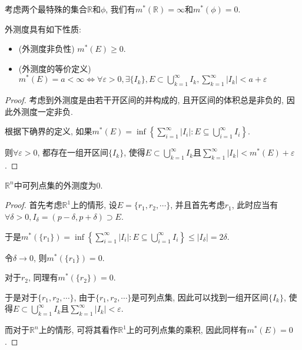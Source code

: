 \documentclass[theorem=false,mathfont=none,openany,sub3section]{easybook}
\begin{document}
\begin{example}
  考虑两个最特殊的集合$\mathbb{R}$和$\phi$, 我们有$m^{*}(\mathbb{R})=\infty$和$m^{*}(\phi)=0$.\par
\end{example}

\begin{proposition}
  外测度具有如下性质:\par
  \begin{itemize}
    \item (外测度非负性) $m^{*}(E)\geqslant 0$.
    \item (外测度的等价定义) $m^{*}(E)=a<\infty \Leftrightarrow \forall \varepsilon >0, \exists \{I_k\}, E\subset \bigcup_{k=1}^{\infty}I_k, \sum_{k=1}^{\infty}|I_k|<a+\varepsilon$
  \end{itemize}
\end{proposition}

\begin{proof}
  考虑到外测度是由若干开区间的并构成的, 且开区间的体积总是非负的, 因此外测度一定非负.\par
  根据下确界的定义, 如果$m^{*}(E)=\inf\left\{\sum_{i=1}^{\infty}|I_i|: E\subseteq \bigcup_{i=1}^{\infty}I_i\right\}$.\par
  则$\forall \varepsilon >0$, 都存在一组开区间$\{I_k\}$, 使得$E\subset \bigcup_{k=1}^{\infty}I_k$且$\sum_{k=1}^{\infty}|I_k|<m^{*}(E)+\varepsilon$.\par
\end{proof}

\begin{corollary}
  $\mathbb{R}^n$中可列点集的外测度为0.\par
\end{corollary}

\begin{proof}
  首先考虑$\mathbb{R}^1$上的情形, 设$E=\{r_1,r_2,\cdots\}$, 并且首先考虑$r_1$, 此时应当有$\forall \delta >0, I_{\delta} = (p-\delta,p+\delta)\supset E$.\par
  于是$m^{*}(\{r_1\})=\inf\left\{\sum_{i=1}^{\infty}|I_i|: E\subseteq \bigcup_{i=1}^{\infty}I_i\right\}\leqslant |I_{\delta}|=2\delta.$\par
  令$\delta \to 0$, 则$m^{*}(\{r_1\})=0$.\par
  对于$r_2$, 同理有$m^{*}(\{r_2\})=0$.\par
  于是对于$\{r_1,r_2,\cdots\}$, 由于$\{r_1,r_2,\cdots\}$是可列点集, 因此可以找到一组开区间$\{I_k\}$, 使得$E\subset \bigcup_{k=1}^{\infty}I_k$且$\sum_{k=1}^{\infty}|I_k|<\varepsilon$.\par
  而对于$\mathbb{R}^n$上的情形, 可将其看作$\mathbb{R}^1$上的可列点集的乘积, 因此同样有$m^{*}(E)=0$.\par
\end{proof}
\end{document}
